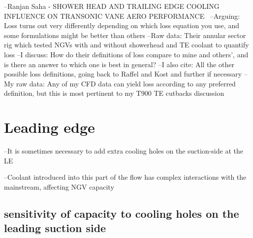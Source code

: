 \documentclass[a4paper, 11pt, twoside]{report}
\begin{document}
--Ranjan Saha - SHOWER HEAD AND TRAILING EDGE COOLING INFLUENCE ON TRANSONIC VANE AERO PERFORMANCE~\cite{saha_loss}
	--Arguing: Loss turns out very differently depending on which loss equation you use, and some formulations might be better than others
	--Raw data: Their annular sector rig which tested NGVs with and without showerhead and TE coolant to quantify loss
	--I discuss: How do their definitions of loss compare to mine and others', and is there an answer to which one is best in general?
	--I also cite: All the other possible loss definitions, going back to Raffel and Kost and further if necessary
	--My raw data: Any of my CFD data can yield loss according to any preferred definition, but this is most pertinent to my T900 TE cutbacks discussion





\chapter{Leading edge}
\label{chapter_leading_edge}



--It is sometimes necessary to add extra cooling holes on the suction-side at the LE

--Coolant introduced into this part of the flow has complex interactions with the mainstream, affecting NGV capacity
 
 
\section{sensitivity of capacity to cooling holes on the leading suction side}
\end{document}
